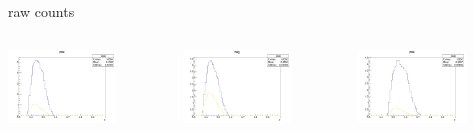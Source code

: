 \begin{frame}{raw counts}
\begin{columns}
\begin{column}[T]{0.25\textwidth}
\includegraphics[width = 0.7\textwidth]{results/yield/statistics/yield_x_Q2_z_0.60_5.500_0.45_pos.png}
\end{column}
\begin{column}[T]{0.25\textwidth}
\includegraphics[width = 0.7\textwidth]{results/yield/statistics/yield_x_Q2_z_0.60_5.500_0.45_neg.png}
\end{column}
\begin{column}[T]{0.25\textwidth}
\includegraphics[width = 0.7\textwidth]{results/yield/statistics/yield_x_Q2_z_0.60_5.500_0.55_pos.png}

\end{column}
\end{columns}
\end{frame}

